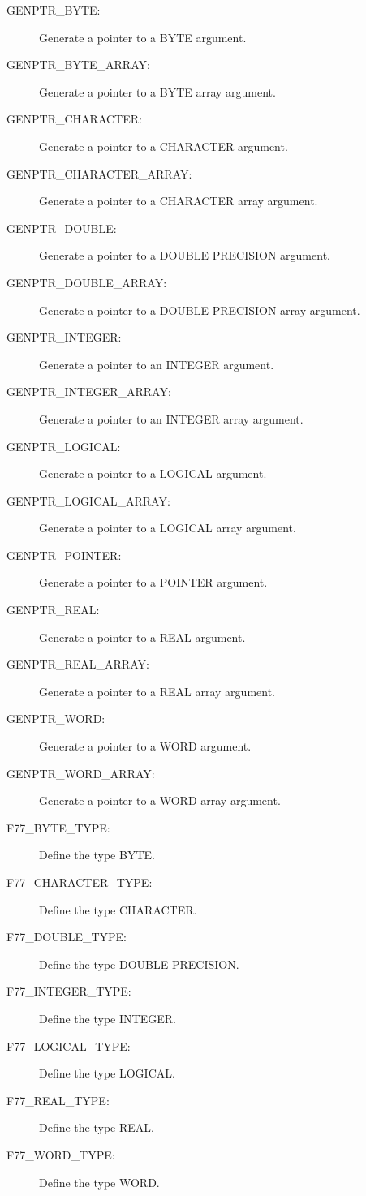 \begin{description}
\begin{description}
\item [GENPTR\_BYTE:]  Generate a pointer to a BYTE argument.
\item [GENPTR\_BYTE\_ARRAY:]  Generate a pointer to a BYTE array argument.
\item [GENPTR\_CHARACTER:]  Generate a pointer to a CHARACTER argument.
\item [GENPTR\_CHARACTER\_ARRAY:]  Generate a pointer to a CHARACTER array argument.
\item [GENPTR\_DOUBLE:]  Generate a pointer to a DOUBLE PRECISION argument.
\item [GENPTR\_DOUBLE\_ARRAY:]  Generate a pointer to a DOUBLE PRECISION array argument.
\item [GENPTR\_INTEGER:]  Generate a pointer to an INTEGER argument.
\item [GENPTR\_INTEGER\_ARRAY:]  Generate a pointer to an INTEGER array argument.
\item [GENPTR\_LOGICAL:]  Generate a pointer to a LOGICAL argument.
\item [GENPTR\_LOGICAL\_ARRAY:]  Generate a pointer to a LOGICAL array argument.
\item [GENPTR\_POINTER:]  Generate a pointer to a POINTER argument.
\item [GENPTR\_REAL:]  Generate a pointer to a REAL argument.
\item [GENPTR\_REAL\_ARRAY:]  Generate a pointer to a REAL array argument.
\item [GENPTR\_WORD:]  Generate a pointer to a WORD argument.
\item [GENPTR\_WORD\_ARRAY:]  Generate a pointer to a WORD array argument.
\end{description}

\item [Data types ---]

\begin{description}
\item [F77\_BYTE\_TYPE:]  Define the type BYTE.
\item [F77\_CHARACTER\_TYPE:]  Define the type CHARACTER.
\item [F77\_DOUBLE\_TYPE:]  Define the type DOUBLE PRECISION.
\item [F77\_INTEGER\_TYPE:]  Define the type INTEGER.
\item [F77\_LOGICAL\_TYPE:]  Define the type LOGICAL.
\item [F77\_REAL\_TYPE:]  Define the type REAL.
\item [F77\_WORD\_TYPE:]  Define the type WORD.
\end{description}


\end{description}
